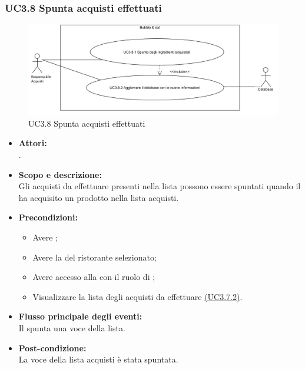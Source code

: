 \subsubsection{UC3.8 Spunta acquisti effettuati} \label{UC3.8}

\begin{figure}[H]
	\centering
	\includegraphics[width=15cm]{../../documenti/AnalisiDeiRequisiti/Diagrammi_img/uc3_8.png}
	\caption{UC3.8 Spunta acquisti effettuati}
\end{figure}

\begin{itemize}
	\item \textbf{Attori:}
	\\.
	\item \textbf{Scopo e descrizione:} 
	\\Gli acquisti da effettuare presenti nella lista possono essere spuntati quando il  ha acquisito un prodotto nella lista acquisti.
	\item \textbf{Precondizioni:}
	\begin{itemize}
		\item Avere ;
		\item Avere la  del ristorante selezionato;
		\item Avere accesso alla  con il ruolo di ;
		\item Visualizzare la lista degli acquisti da effettuare \hyperref[UC3.7.2]{(UC3.7.2)}.
	\end{itemize}
	\item \textbf{Flusso principale degli eventi:}
	\\Il {} spunta una voce della lista.
	\item \textbf{Post-condizione:}
	\\La voce della lista acquisti è stata spuntata.
\end{itemize}

